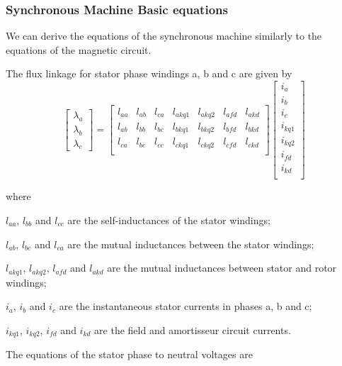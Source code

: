 \subsubsection{Synchronous Machine Basic equations}

We can derive the equations of the synchronous machine similarly to the equations of the magnetic circuit.

The flux linkage for stator phase windings a, b and c are given by
\begin{equation} \label{eq:FluxStator}
	\begin{bmatrix}
		\lambda_a \\
		\lambda_b \\
		\lambda_c
	\end{bmatrix}
	=
	\begin{bmatrix}
		l_{aa} & l_{ab} & l_{ca} & l_{akq1} & l_{akq2} & l_{afd} & l_{akd} \\  
		l_{ab} & l_{bb} & l_{bc} & l_{bkq1} & l_{bkq2} & l_{bfd} & l_{bkd} \\  
		l_{ca} & l_{bc} & l_{cc} & l_{ckq1} & l_{ckq2} & l_{cfd} & l_{ckd} \\  
	\end{bmatrix}
	\begin{bmatrix}
		i_a \\
		i_b \\
		i_c \\
		i_{kq1} \\
		i_{kq2} \\
		i_{fd} \\
		i_{kd} \\
	\end{bmatrix}
\end{equation}

where

$l_{aa}$, $l_{bb}$ and $l_{cc}$ are the self-inductances of the stator windings;

$l_{ab}$, $l_{bc}$ and $l_{ca}$ are the mutual inductances between the stator windings;

$l_{akq1}$, $l_{akq2}$, $l_{afd}$ and $l_{akd}$ are the mutual inductances between stator and rotor windings;

$i_a$, $i_b$ and $i_c$ are the instantaneous stator currents in phases a, b and c;

$i_{kq1}$, $i_{kq2}$, $i_{fd}$ and $i_{kd}$ are the field and amortisseur circuit currents.
 
The equations of the stator phase to neutral voltages are

